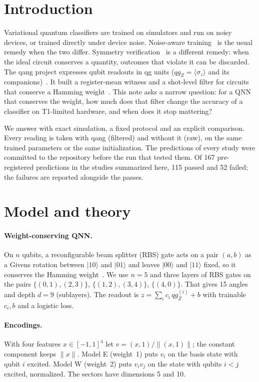 \documentclass[11pt]{article}
\newcommand{\qZ}{qg_Z}
\begin{document}
\section{Introduction}

Variational quantum classifiers are trained on simulators and run on noisy devices, or trained directly
under device noise. Noise-aware training~\cite{wang2022quantumnat} is the usual remedy when the two
differ. Symmetry verification~\cite{bonetmonroig2018,mcardle2019} is a different remedy: when the ideal
circuit conserves a quantity, outcomes that violate it can be discarded. The qang project expresses
qubit readouts in qg units ($\qZ=\langle\sigma_z\rangle$ and its companions)~\cite{monteverde2026qang}. It
built a register-mean witness and a shot-level filter for circuits that conserve a Hamming
weight~\cite{monteverde2026witness}. This note asks a narrow question: for a QNN that conserves the weight,
how much does that filter change the accuracy of a classifier on T1-limited hardware, and when does it stop
mattering?

We answer with exact simulation, a fixed protocol and an explicit comparison. Every reading is taken with
qang (filtered) and without it (raw), on the same trained parameters or the same initialization. The
predictions of every study were committed to the repository before the run that tested them. Of 167 pre-registered predictions in the studies summarized here, 115 passed and 52 failed; the failures are
reported alongside the passes.

\section{Model and theory}

\paragraph{Weight-conserving QNN.} On $n$ qubits, a reconfigurable beam splitter (RBS) gate acts on a pair
$(a,b)$ as a Givens rotation between $|10\rangle$ and $|01\rangle$ and leaves $|00\rangle$ and $|11\rangle$
fixed, so it conserves the Hamming weight~\cite{landman2022}. We use $n=5$ and three layers of RBS gates on
the pairs $\{(0,1),(2,3)\}$, $\{(1,2),(3,4)\}$, $\{(4,0)\}$. That gives 15 angles and depth $d=9$ (sublayers).
The readout is $z=\sum_i c_i\,\qZ^{(i)}+b$ with trainable $c_i,b$ and a logistic loss.

\paragraph{Encodings.} With four features $x\in[-1,1]^4$ let $v=(x,1)/\|(x,1)\|$; the constant component
keeps $\|x\|$. Model E (weight~1) puts $v_i$ on the basis state with qubit $i$ excited. Model W (weight~2)
puts $v_iv_j$ on the state with qubits $i<j$ excited, normalized. The sectors have dimensions 5 and 10.
\end{document}
